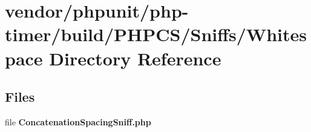\section{vendor/phpunit/php-\/timer/build/\+P\+H\+P\+C\+S/\+Sniffs/\+Whitespace Directory Reference}
\label{dir_6c6c75d4b83a4bc0de7f75a9db7a902f}
\subsection*{Files}
\begin{DoxyCompactItemize}
\item 
file {\bf Concatenation\+Spacing\+Sniff.\+php}
\end{DoxyCompactItemize}
